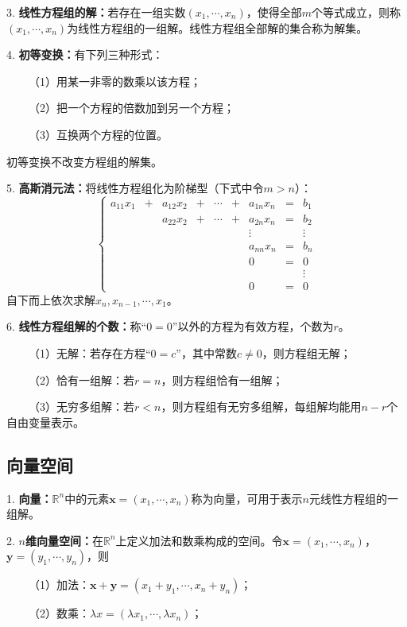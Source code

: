 3. \textbf{线性方程组的解：}若存在一组实数$(x_1,\cdots,x_n)$，使得全部$m$个等式成立，则称$(x_1,\cdots,x_n)$为线性方程组的一组解。线性方程组全部解的集合称为解集。

4. \textbf{初等变换：}有下列三种形式：

~~~~（1）用某一非零的数乘以该方程；

~~~~（2）把一个方程的倍数加到另一个方程；

~~~~（3）互换两个方程的位置。

初等变换不改变方程组的解集。

5. \textbf{高斯消元法：}将线性方程组化为阶梯型（下式中令$m>n$）：
\begin{equation*}
    \left\{\begin{aligned}
        a_{11}x_1&+&a_{12}x_2&+&\cdots&+&a_{1n}x_n&=&b_1\\
        &&a_{22}x_2&+&\cdots&+&a_{2n}x_n&=&b_2\\
        &&&&&&\vdots&&\vdots\\
        &&&&&&a_{nn}x_n&=&b_n\\
        &&&&&&0&=&0\\
        &&&&&&&&\vdots\\
        &&&&&&0&=&0
    \end{aligned}\right.
\end{equation*}
自下而上依次求解$x_n,x_{n-1},\cdots,x_1$。

6. \textbf{线性方程组解的个数：}称“$0=0$”以外的方程为有效方程，个数为$r$。

~~~~（1）无解：若存在方程“$0=c$”，其中常数$c\neq 0$，则方程组无解；

~~~~（2）恰有一组解：若$r=n$，则方程组恰有一组解；

~~~~（3）无穷多组解：若$r<n$，则方程组有无穷多组解，每组解均能用$n-r$个自由变量表示。

\subsection{向量空间}

1. \textbf{向量：}$\mathbb{R}^n$中的元素$\boldsymbol{x}=(x_1,\cdots,x_n)$称为向量，可用于表示$n$元线性方程组的一组解。

2. \textbf{$n$维向量空间：}在$\mathbb{R}^n$上定义加法和数乘构成的空间。令$\boldsymbol{x}=(x_1,\cdots,x_n)$，$\boldsymbol{y}=(y_1,\cdots,y_n)$，则

~~~~（1）加法：$\boldsymbol{x}+\boldsymbol{y}=(x_1+y_1,\cdots,x_n+y_n)$；

~~~~（2）数乘：$\lambda x =(\lambda x_1,\cdots,\lambda x_n)$；

